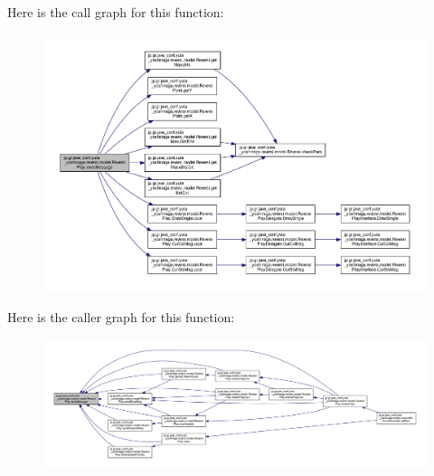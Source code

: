 Here is the call graph for this function\+:
\nopagebreak
\begin{figure}[H]
\begin{center}
\leavevmode
\includegraphics[width=350pt]{classjp_1_1gr_1_1java__conf_1_1yuta__yoshinaga_1_1reversi_1_1model_1_1_reversi_play_a8c5c00aeb6656d7806416ac577b77e3b_cgraph}
\end{center}
\end{figure}
Here is the caller graph for this function\+:
\nopagebreak
\begin{figure}[H]
\begin{center}
\leavevmode
\includegraphics[width=350pt]{classjp_1_1gr_1_1java__conf_1_1yuta__yoshinaga_1_1reversi_1_1model_1_1_reversi_play_a8c5c00aeb6656d7806416ac577b77e3b_icgraph}
\end{center}
\end{figure}
\mbox{\label{classjp_1_1gr_1_1java__conf_1_1yuta__yoshinaga_1_1reversi_1_1model_1_1_reversi_play_aaf0f07bdc219b6d8ec5551457fb551ab}} 
